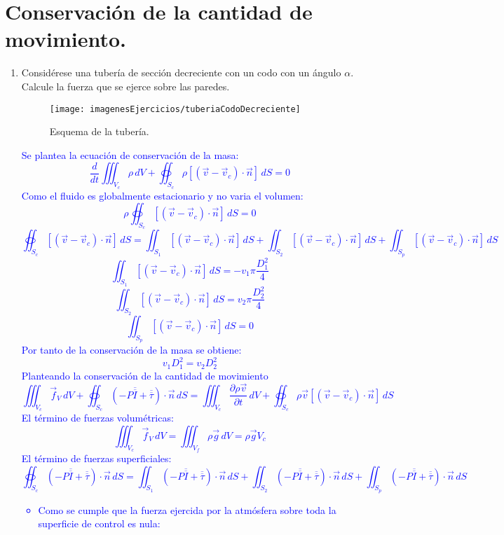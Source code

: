 \section{Conservación de la cantidad de movimiento.}
\begin{enumerate}
	\item Considérese una tubería de sección decreciente con un codo con un ángulo $\alpha$. Calcule la fuerza que se ejerce sobre las paredes.
	\begin{figure}[H]
		\centering
		\texttt{[image: imagenesEjercicios/tuberiaCodoDecreciente]}
		\caption{Esquema de la tubería.}
		\label{fig:tuberiacododecreciente}
	\end{figure}
	\textcolor{blue}{
	Se plantea la ecuación de conservación de la masa:  
	\[\dfrac{d}{dt}\iiint_{V_c}\rho\,dV+\oiint_{S_c} \rho\left[(\vec{v}-\vec{v}_c)\cdot\vec{n}\right] \,dS=0\]
	Como el fluido es globalmente estacionario y no varia el volumen:
	\[\rho\oiint_{S_c} \left[(\vec{v}-\vec{v}_c)\cdot\vec{n}\right] \,dS=0\]
	\[\oiint_{S_c} \left[(\vec{v}-\vec{v}_c)\cdot\vec{n}\right] \,dS=
	\iint_{S_1} \left[(\vec{v}-\vec{v}_c)\cdot\vec{n}\right] \,dS
	+
	\iint_{S_2} \left[(\vec{v}-\vec{v}_c)\cdot\vec{n}\right] \,dS
	+
	\iint_{S_p} \left[(\vec{v}-\vec{v}_c)\cdot\vec{n}\right] \,dS\]
	\[\iint_{S_1} \left[(\vec{v}-\vec{v}_c)\cdot\vec{n}\right] \,dS=-v_1\pi\dfrac{D_1^2}{4}\]
	\[\iint_{S_2} \left[(\vec{v}-\vec{v}_c)\cdot\vec{n}\right] \,dS=v_2\pi\dfrac{D_2^2}{4}\]
	\[\iint_{S_p} \left[(\vec{v}-\vec{v}_c)\cdot\vec{n}\right] \,dS=0\]
	Por tanto de la conservación de la masa se obtiene:
	\[v_1D_1^2=v_2D_2^2\]
	Planteando la conservación de la cantidad de movimiento
	\[\iiint_{V_c}\vec{f}_V\,dV
	+
	\oiint_{S_c}\left(-P\overline{\overline{I}}+\overline{\overline{\tau}}\right)\cdot\vec{n}\,dS=
	\iiint_{V_c}\dfrac{\partial \rho\vec{v}}{\partial t}\,dV
	+\oiint_{S_c}\rho\vec{v}\left[\left(\vec{v}-\vec{v}_c\right)\cdot\vec{n}\right]\,dS\]
	El término de fuerzas volumétricas:
	\[\iiint_{V_c}\vec{f}_V\,dV=\iiint_{V_f}\rho\vec{g}\,dV=\rho \vec{g}V_c\]
	El término de fuerzas superficiales:
	\[\oiint_{S_c}\left(-P\overline{\overline{I}}+\overline{\overline{\tau}}\right)\cdot\vec{n}\,dS=
	\iint_{S_1}\left(-P\overline{\overline{I}}+\overline{\overline{\tau}}\right)\cdot\vec{n}\,dS
	+
	\iint_{S_2}\left(-P\overline{\overline{I}}+\overline{\overline{\tau}}\right)\cdot\vec{n}\,dS
	+
	\iint_{S_p}\left(-P\overline{\overline{I}}+\overline{\overline{\tau}}\right)\cdot\vec{n}\,dS
	\]
	\begin{itemize}
		\item 	Como se cumple que la fuerza ejercida por la atmósfera sobre toda la superficie de control es nula:

\end{itemize}}
\end{enumerate}
